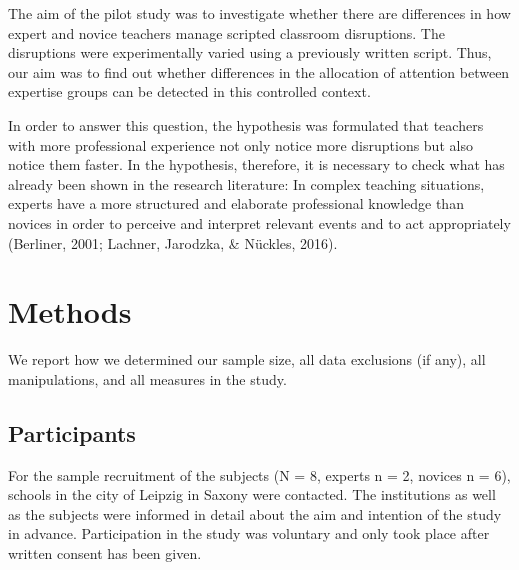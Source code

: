 \documentclass[
  english,
  man,floatsintext]{apa6}
\begin{document}
The aim of the pilot study was to investigate whether there are differences in how expert and novice teachers manage scripted classroom disruptions. The disruptions were experimentally varied using a previously written script. Thus, our aim was to find out whether differences in the allocation of attention between expertise groups can be detected in this controlled context.

In order to answer this question, the hypothesis was formulated that teachers with more professional experience not only notice more disruptions but also notice them faster. In the hypothesis, therefore, it is necessary to check what has already been shown in the research literature: In complex teaching situations, experts have a more structured and elaborate professional knowledge than novices in order to perceive and interpret relevant events and to act appropriately (Berliner, 2001; Lachner, Jarodzka, \& Nückles, 2016).

\hypertarget{methods}{%
\section{Methods}\label{methods}}

We report how we determined our sample size, all data exclusions (if any), all manipulations, and all measures in the study.

\hypertarget{participants}{%
\subsection{Participants}\label{participants}}

For the sample recruitment of the subjects (N = 8, experts n = 2, novices n = 6), schools in the city of Leipzig in Saxony were contacted. The institutions as well as the subjects were informed in detail about the aim and intention of the study in advance. Participation in the study was voluntary and only took place after written consent has been given.
\end{document}
